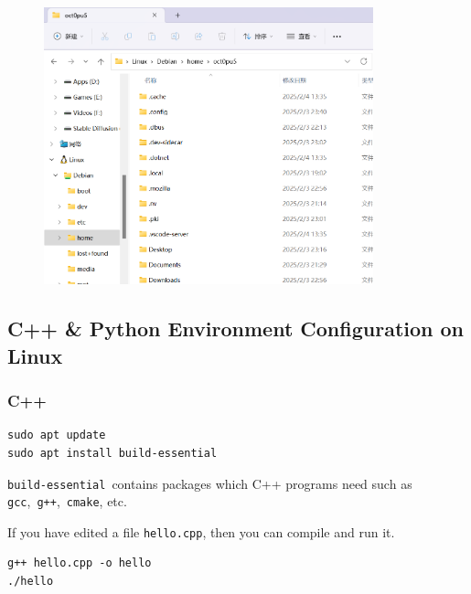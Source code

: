 \documentclass[12pt]{ctexart}
\begin{document}
\begin{figure}[H]
    \centering
    \includegraphics[width=0.85\textwidth,keepaspectratio]{assets/Linux/1.1 How to install Debian on Windows/7.png}
\end{figure}

\subsection{\textbf{C++ \& Python Environment Configuration on Linux}}

\subsubsection{\textbf{C++}}

\begin{adjustwidth}{2em}{0pt}
\begin{verbatim}
sudo apt update
sudo apt install build-essential
\end{verbatim}
\end{adjustwidth}

\texttt{build-essential}\ contains packages which C++ programs need such
as \texttt{gcc},\ \texttt{g++},\ \texttt{cmake}, etc.

If you have edited a file \texttt{hello.cpp}, then you can compile and
run it.

\begin{adjustwidth}{2em}{0pt}
\begin{verbatim}
g++ hello.cpp -o hello
./hello
\end{verbatim}
\end{adjustwidth}
\end{document}
